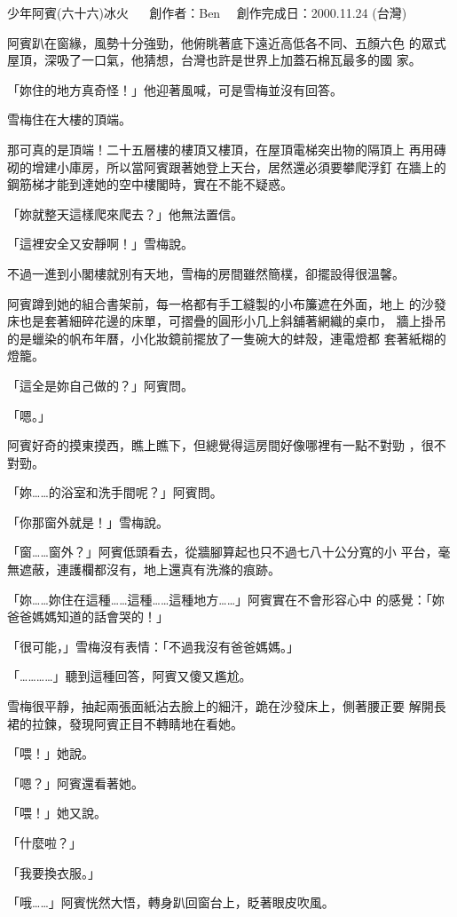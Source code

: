 



少年阿賓(六十六)冰火
　
創作者：Ben　
創作完成日：2000.11.24 (台灣)


阿賓趴在窗緣，風勢十分強勁，他俯眺著底下遠近高低各不同、五顏六色
的眾式屋頂，深吸了一口氣，他猜想，台灣也許是世界上加蓋石棉瓦最多的國
家。

「妳住的地方真奇怪！」他迎著風喊，可是雪梅並沒有回答。

雪梅住在大樓的頂端。

那可真的是頂端！二十五層樓的樓頂又樓頂，在屋頂電梯突出物的隔頂上
再用磚砌的增建小庫房，所以當阿賓跟著她登上天台，居然還必須要攀爬浮釘
在牆上的鋼筋梯才能到達她的空中樓閣時，實在不能不疑惑。

「妳就整天這樣爬來爬去？」他無法置信。

「這裡安全又安靜啊！」雪梅說。

不過一進到小閣樓就別有天地，雪梅的房間雖然簡樸，卻擺設得很溫馨。

阿賓蹲到她的組合書架前，每一格都有手工縫製的小布簾遮在外面，地上
的沙發床也是套著細碎花邊的床單，可摺疊的圓形小几上斜舖著網織的桌巾，
牆上掛吊的是蠟染的帆布年曆，小化妝鏡前擺放了一隻碗大的蚌殼，連電燈都
套著紙糊的燈籠。

「這全是妳自己做的？」阿賓問。

「嗯。」

阿賓好奇的摸東摸西，瞧上瞧下，但總覺得這房間好像哪裡有一點不對勁
，很不對勁。

「妳……的浴室和洗手間呢？」阿賓問。

「你那窗外就是！」雪梅說。

「窗……窗外？」阿賓低頭看去，從牆腳算起也只不過七八十公分寬的小
平台，毫無遮蔽，連護欄都沒有，地上還真有洗滌的痕跡。

「妳……妳住在這種……這種……這種地方……」阿賓實在不會形容心中
的感覺：「妳爸爸媽媽知道的話會哭的！」

「很可能，」雪梅沒有表情：「不過我沒有爸爸媽媽。」

「…………」聽到這種回答，阿賓又傻又尷尬。

雪梅很平靜，抽起兩張面紙沾去臉上的細汗，跪在沙發床上，側著腰正要
解開長裙的拉鍊，發現阿賓正目不轉睛地在看她。

「喂！」她說。

「嗯？」阿賓還看著她。

「喂！」她又說。

「什麼啦？」

「我要換衣服。」

「哦……」阿賓恍然大悟，轉身趴回窗台上，眨著眼皮吹風。

